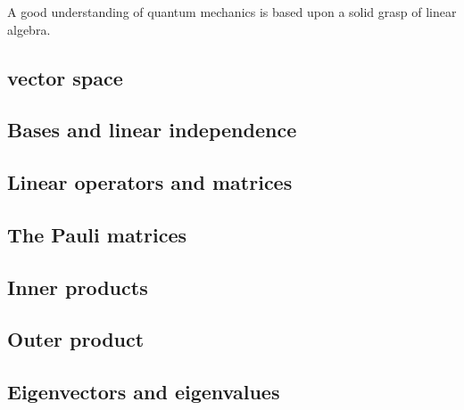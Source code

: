 \documentclass[
	11pt, %
	a4paper, %
]{LegrandOrangeBook}
\begin{document}
A good understanding of quantum mechanics is based upon a solid grasp of linear algebra.

\subsection{vector space} %


\subsection{Bases and linear independence} %


\subsection{Linear operators and matrices} %


\subsection{The Pauli matrices} %


\subsection{Inner products} %


\subsection{Outer product} %


\subsection{Eigenvectors and eigenvalues} %


\end{document}
